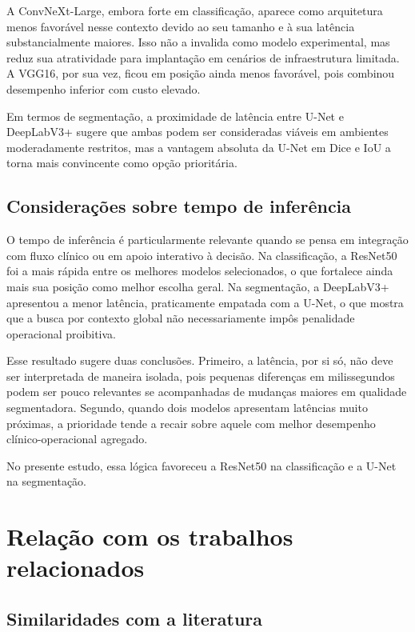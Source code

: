 \documentclass[tcc,capa]{texufpel}
\begin{document}
A ConvNeXt-Large, embora forte em classificação, aparece como arquitetura menos favorável nesse contexto devido ao seu tamanho e à sua latência substancialmente maiores. Isso não a invalida como modelo experimental, mas reduz sua atratividade para implantação em cenários de infraestrutura limitada. A VGG16, por sua vez, ficou em posição ainda menos favorável, pois combinou desempenho inferior com custo elevado.

Em termos de segmentação, a proximidade de latência entre U-Net e DeepLabV3+ sugere que ambas podem ser consideradas viáveis em ambientes moderadamente restritos, mas a vantagem absoluta da U-Net em Dice e IoU a torna mais convincente como opção prioritária.

\subsection{Considerações sobre tempo de inferência}

O tempo de inferência é particularmente relevante quando se pensa em integração com fluxo clínico ou em apoio interativo à decisão. Na classificação, a ResNet50 foi a mais rápida entre os melhores modelos selecionados, o que fortalece ainda mais sua posição como melhor escolha geral. Na segmentação, a DeepLabV3+ apresentou a menor latência, praticamente empatada com a U-Net, o que mostra que a busca por contexto global não necessariamente impôs penalidade operacional proibitiva.

Esse resultado sugere duas conclusões. Primeiro, a latência, por si só, não deve ser interpretada de maneira isolada, pois pequenas diferenças em milissegundos podem ser pouco relevantes se acompanhadas de mudanças maiores em qualidade segmentadora. Segundo, quando dois modelos apresentam latências muito próximas, a prioridade tende a recair sobre aquele com melhor desempenho clínico-operacional agregado.

No presente estudo, essa lógica favoreceu a ResNet50 na classificação e a U-Net na segmentação.

\section{Relação com os trabalhos relacionados}

\subsection{Similaridades com a literatura}
\end{document}
